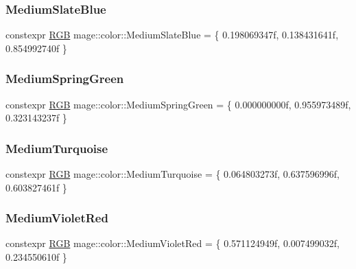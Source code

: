 \subsubsection{\texorpdfstring{Medium\+Slate\+Blue}{MediumSlateBlue}}
{\footnotesize\ttfamily constexpr \hyperlink{structmage_1_1_r_g_b}{R\+GB} mage\+::color\+::\+Medium\+Slate\+Blue = \{ 0.\+198069347f, 0.\+138431641f, 0.\+854992740f \}}

\hypertarget{namespacemage_1_1color_ad301b4945f333081cdfe7e49e7db2bd3}{}\label{namespacemage_1_1color_ad301b4945f333081cdfe7e49e7db2bd3} 
\subsubsection{\texorpdfstring{Medium\+Spring\+Green}{MediumSpringGreen}}
{\footnotesize\ttfamily constexpr \hyperlink{structmage_1_1_r_g_b}{R\+GB} mage\+::color\+::\+Medium\+Spring\+Green = \{ 0.\+000000000f, 0.\+955973489f, 0.\+323143237f \}}

\hypertarget{namespacemage_1_1color_addbe783ed9989a03f0a3033e47f4f7dc}{}\label{namespacemage_1_1color_addbe783ed9989a03f0a3033e47f4f7dc} 
\subsubsection{\texorpdfstring{Medium\+Turquoise}{MediumTurquoise}}
{\footnotesize\ttfamily constexpr \hyperlink{structmage_1_1_r_g_b}{R\+GB} mage\+::color\+::\+Medium\+Turquoise = \{ 0.\+064803273f, 0.\+637596996f, 0.\+603827461f \}}

\hypertarget{namespacemage_1_1color_aa122b0bf6b5374aaf7d77f1d4e9095ae}{}\label{namespacemage_1_1color_aa122b0bf6b5374aaf7d77f1d4e9095ae} 
\subsubsection{\texorpdfstring{Medium\+Violet\+Red}{MediumVioletRed}}
{\footnotesize\ttfamily constexpr \hyperlink{structmage_1_1_r_g_b}{R\+GB} mage\+::color\+::\+Medium\+Violet\+Red = \{ 0.\+571124949f, 0.\+007499032f, 0.\+234550610f \}}

